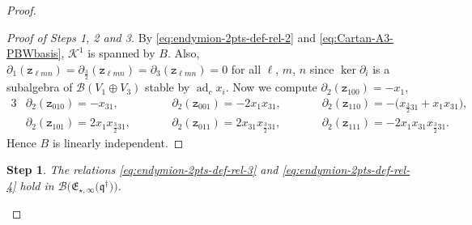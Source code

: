\documentclass[pdftex]{sigma}
\numberwithin{equation}{section}
\newtheorem{stepi}{Step}
\newcommand{\adc}{\operatorname{ad}_c}
\newcommand{\toba}{\mathscr B}
\newcommand{\K}{{\mathcal{K}}}
\newcommand{\zt}{\mathtt{z}}
\newcommand{\eny}{\mathfrak{E}}
\newcommand{\enyIIb}[1]{\eny_{\star,#1}}
\newcommand{\bq}{\mathfrak{q}}
\newcommand{\bqs}{\bq^{\dagger}}
\newcommand{\tresdos}{\frac{3}{2}}
\begin{document}
\begin{proof}
\begin{proof}[Proof of Steps 1, 2 and 3]
By \eqref{eq:endymion-2pts-def-rel-2} and \eqref{eq:Cartan-A3-PBWbasis}, $\K^1$ is spanned by $B$.
Also, $\partial_1(\zt_{\ell mn})=\partial_{\tresdos}(\zt_{\ell mn})=\partial_3(\zt_{\ell mn})=0$ for all $\ell$, $m$, $n$ since $\ker \partial_i$ is a subalgebra of $\toba(V_1\oplus V_3)$ stable by $\adc x_i$. Now we compute $\partial_2(\zt_{100})= -x_1$,
\begin{alignat*}{3}
&\partial_2 (\zt_{010}) = -x_{31}, &&
\partial_2 (\zt_{001}) = -2x_1x_{31}, &&
\partial_2 (\zt_{110}) = -\big(x_{\tresdos31}+x_1x_{31}\big),
\\
&\partial_2 (\zt_{101}) = 2x_1x_{\tresdos31},\qquad &&
\partial_2 (\zt_{011}) = 2x_{31}x_{\tresdos31},\qquad &&
\partial_2 (\zt_{111}) = -2x_1x_{31}x_{\tresdos31}.
\end{alignat*}
Hence $B$ is linearly independent.
\end{proof}

\begin{stepi}\label{lem:endymion-2pts-def-rel-1}
The relations \eqref{eq:endymion-2pts-def-rel-3} and \eqref{eq:endymion-2pts-def-rel-4} hold in $\toba\big(\enyIIb{\infty}\big(\bqs\big)\big)$.
\end{stepi}


\end{proof}
\end{document}
